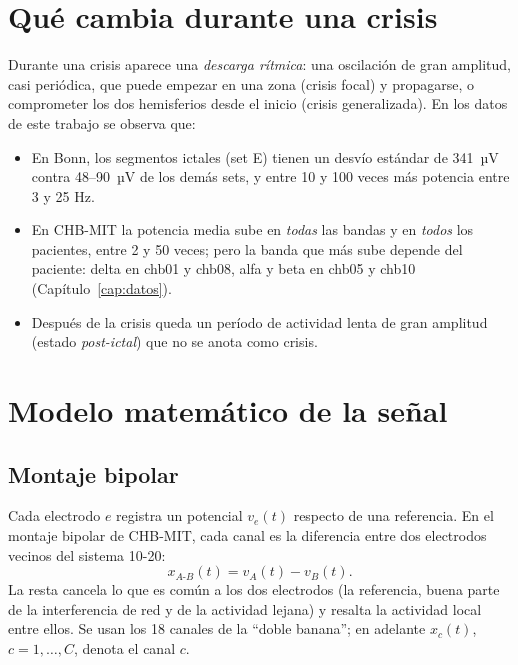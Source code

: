 \section{Qué cambia durante una crisis}

Durante una crisis aparece una \emph{descarga rítmica}: una oscilación de gran amplitud, casi
periódica, que puede empezar en una zona (crisis focal) y propagarse, o comprometer los dos hemisferios
desde el inicio (crisis generalizada). En los datos de este trabajo se observa que:

\begin{itemize}
  \item En Bonn, los segmentos ictales (set E) tienen un desvío estándar de 341~µV contra 48--90~µV
        de los demás sets, y entre 10 y 100 veces más potencia entre 3 y 25 Hz.
  \item En CHB-MIT la potencia media sube en \emph{todas} las bandas y en \emph{todos} los pacientes, entre 2 y
        50 veces; pero la banda que más sube depende del paciente: delta en chb01 y chb08, alfa y
        beta en chb05 y chb10 (Capítulo~\ref{cap:datos}).
  \item Después de la crisis queda un período de actividad lenta de gran amplitud (estado
        \emph{post-ictal}) que no se anota como crisis.
\end{itemize}

\section{Modelo matemático de la señal}
\label{sec:modelo}

\subsection{Montaje bipolar}

Cada electrodo $e$ registra un potencial $v_e(t)$ respecto de una referencia. En el montaje bipolar de
CHB-MIT, cada canal es la diferencia entre dos electrodos vecinos del sistema 10-20:
\begin{equation}
  x_{A\text{-}B}(t) = v_A(t) - v_B(t).
  \label{eq:bipolar}
\end{equation}
La resta cancela lo que es común a los dos electrodos (la referencia, buena parte de la interferencia
de red y de la actividad lejana) y resalta la actividad local entre ellos. Se usan los 18 canales de la
``doble banana''; en adelante $x_c(t)$, $c = 1,\dots,C$, denota el canal $c$.

